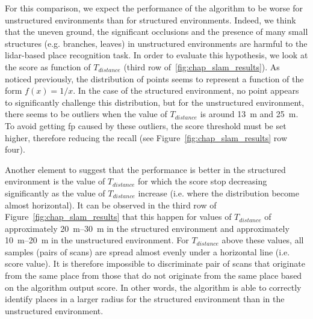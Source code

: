 For this comparison, we expect the performance of the algorithm to be worse for unstructured environments than for structured environments. Indeed, we think that the uneven ground, the significant occlusions and the presence of many small structures (e.g. branches, leaves) in unstructured environments are harmful to the \gls*{lidar}-based place recognition task. In order to evaluate this hypothesis, we look at the score as function of $T_{distance}$ (third row of~\ref{fig:chap_slam_results}). As noticed previously, the distribution of points seems to represent a function of the form $f(x) = 1 / x$. In the case of the structured environment, no point appears to significantly challenge this distribution, but for the unstructured environment, there seems to be outliers when the value of $T_{distance}$ is around \SI{13}{\meter} and \SI{25}{\meter}. To avoid getting \gls*{fp} caused by these outliers, the score threshold must be set higher, therefore reducing the recall (see Figure~\ref{fig:chap_slam_results} row four).

Another element to suggest that the performance is better in the structured environment is the value of $T_{distance}$ for which the score stop decreasing significantly as the value of $T_{distance}$ increase (i.e. where the distribution become almost horizontal). It can be observed in the third row of Figure~\ref{fig:chap_slam_results} that this happen for values of $T_{distance}$ of approximately \SIrange{20}{30}{\meter} in the structured environment and approximately \SIrange{10}{20}{\meter} in the unstructured environment. For $T_{distance}$ above these values, all samples (pairs of scans) are spread almost evenly under a horizontal line (i.e. score value). It is therefore impossible to discriminate pair of scans that originate from the same place from those that do not originate from the same place based on the algorithm output score. In other words, the algorithm is able to correctly identify places in a larger radius for the structured environment than in the unstructured environment.


